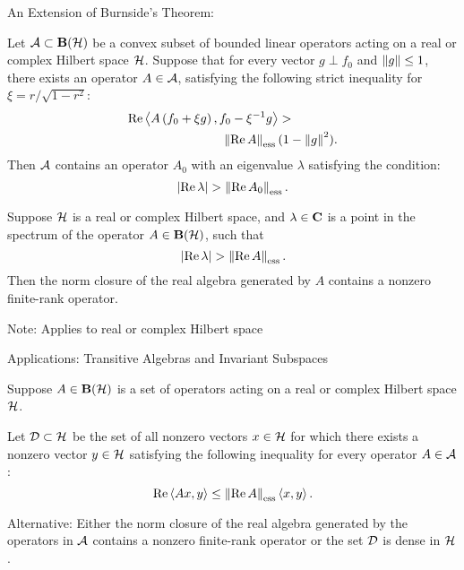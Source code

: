 
\begin{slide}{}
An Extension of Burnside's Theorem:

\begin{prop}
Let $\mathcal{A}\subset\mathbf{B}(\mathcal{H})$ be a convex subset of bounded linear
operators acting on a real or complex Hilbert space $\mathcal{H}$.
Suppose that for every vector $g\perp{}f_0$ and
$\left\Vert g\right\Vert\leq1$, there exists an operator $A\in\mathcal{A}$, satisfying
the following strict inequality for $\xi=r/\sqrt{1-r^2}$:
\begin{eqnarray*}
   \operatorname{Re}\left<A\left(f_0+\xi{g}\right), f_0-\xi^{-1}g\right> >
    ~~~~~~~~~~~ \\
   \left\Vert\operatorname{Re}{}A\right\Vert_{\operatorname{ess}}(1 - \left\Vert g\right\Vert^2).
\end{eqnarray*}
Then $\mathcal{A}$ contains an operator $A_0$ with an eigenvalue
$\lambda$ satisfying the condition:
\[ \left\vert\operatorname{Re}\lambda\right\vert>\left\Vert\operatorname{Re}{}A_0\right\Vert_{\operatorname{ess}}. \]
\end{prop}
\end{slide}


\begin{slide}{}
\begin{prop}
Suppose $\mathcal{H}$ is a real or complex Hilbert space, and
$\lambda\in\mathbf{C}$ is a point in the spectrum of the operator
$A\in\mathbf{B}(\mathcal{H})$, such that
\[ \left\vert\operatorname{Re}\lambda\right\vert > \left\Vert\operatorname{Re}{}A\right\Vert_{\operatorname{ess}}. \]
Then the norm closure of the real algebra generated by $A$
contains a nonzero finite-rank operator.
\end{prop}

\bigskip

Note: Applies to real or complex Hilbert space

Applications: Transitive Algebras and Invariant Subspaces

\end{slide}


\begin{slide}{}
Suppose $A\in\mathbf{B}(\mathcal{H})$ is a set of operators acting on a real or
complex Hilbert space $\mathcal{H}$.

\begin{defn}
Let $\mathcal{D}\subset\mathcal{H}$ be the set of all non\-zero vectors
$x\in\mathcal{H}$ for which there exists a nonzero vector $y\in\mathcal{H}$
satisfying the following inequality for every operator
$A\in\mathcal{A}$:
\[ \operatorname{Re}\left<A{}x,y\right> \leq \left\Vert\operatorname{Re}{}A\right\Vert_{\operatorname{ess}} \left<x,y\right>. \]
\end{defn}

Alternative: Either the norm closure of the real algebra
generated by the operators in $\mathcal{A}$ contains a nonzero
finite-rank operator or the set $\mathcal{D}$ is dense in $\mathcal{H}$.
\end{slide}


